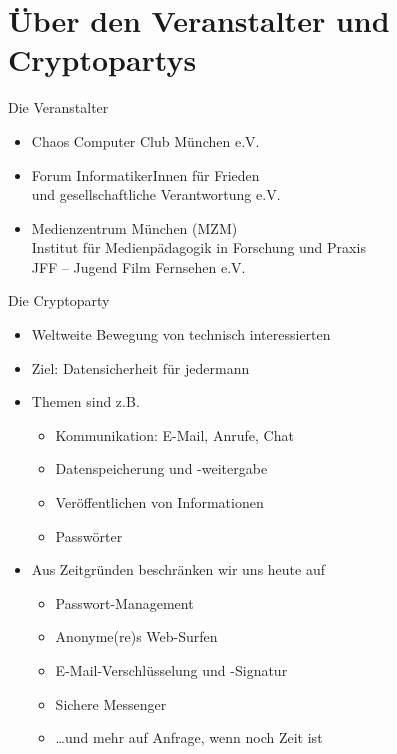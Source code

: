 \section{Über den Veranstalter und Cryptopartys}
\begin{frame}{Die Veranstalter}
  \begin{itemize}
    \item Chaos Computer Club München e.V.
    \item Forum InformatikerInnen für Frieden\\und gesellschaftliche Verantwortung e.V.
    \item Medienzentrum München (MZM)\\Institut für Medienpädagogik in Forschung und Praxis\\JFF -- Jugend Film Fernsehen e.V.
  \end{itemize}
\end{frame}

\begin{frame}{Die Cryptoparty}
  \begin{itemize}
    \item Weltweite Bewegung von technisch interessierten
    \item Ziel: Datensicherheit für jedermann
    \item Themen sind z.B.
    \begin{itemize}
      \item Kommunikation: E-Mail, Anrufe, Chat
      \item Datenspeicherung und -weitergabe
      \item Veröffentlichen von Informationen
      \item Passwörter
    \end{itemize}
    \item Aus Zeitgründen beschränken wir uns heute auf 
    \begin{itemize}
      \item Passwort-Management
      \item Anonyme(re)s Web-Surfen
      \item E-Mail-Verschlüsselung und -Signatur
      \item Sichere Messenger
      \item \ldots und mehr auf Anfrage, wenn noch Zeit ist
    \end{itemize}
  \end{itemize}
\end{frame}

\endinput
